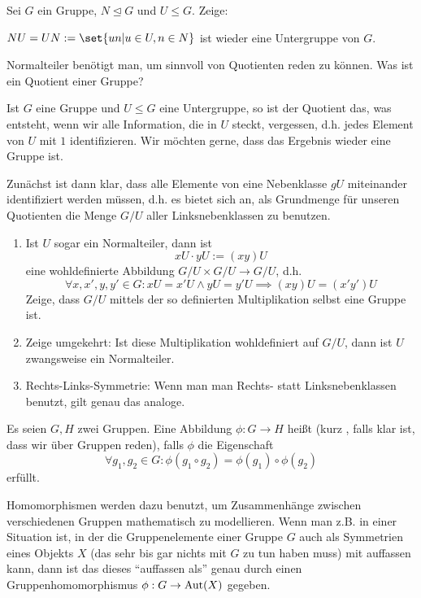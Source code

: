 \begin{sheet}
\begin{problem}[title={Normalteiler und Untergruppen},difficulty={leicht bis mittel}]
Sei $G$ ein Gruppe, $N\unlhd G$ und $U\leq G$. Zeige:

$NU = UN := \set{un | u\in U, n\in N}$ ist wieder eine Untergruppe von $G$.
\end{problem}

\begin{problem}[title={Quotientengruppen I: Konstruktion}, difficulty={fortgeschritten}]
Normalteiler benötigt man, um sinnvoll von Quotienten reden zu können. Was ist ein Quotient einer Gruppe?

Ist $G$ eine Gruppe und $U\leq G$ eine Untergruppe, so ist der Quotient das, was entsteht, wenn wir alle Information, die in $U$ steckt, vergessen, d.h. jedes Element von $U$ mit $1$ identifizieren. Wir möchten gerne, dass das Ergebnis wieder eine Gruppe ist.

Zunächst ist dann klar, dass alle Elemente von eine Nebenklasse $gU$ miteinander identifiziert werden müssen, d.h. es bietet sich an, als Grundmenge für unseren Quotienten die Menge $G/U$ aller Linksnebenklassen zu benutzen.
\begin{enumerate}
\item Ist $U$ sogar ein Normalteiler, dann ist
\[xU \cdot yU := (xy)U\]
eine wohldefinierte Abbildung $G/U \times G/U \to G/U$, d.h.
\[\forall x,x',y,y'\in G: xU=x'U \wedge yU=y'U \implies (xy)U = (x'y')U\]
Zeige, dass $G/U$ mittels der so definierten Multiplikation selbst eine Gruppe ist.
\item Zeige umgekehrt: Ist diese Multiplikation wohldefiniert auf $G/U$, dann ist $U$ zwangsweise ein Normalteiler.
\item Rechts-Links-Symmetrie: Wenn man man Rechts- statt Linksnebenklassen benutzt, gilt genau das analoge.
\end{enumerate}
\end{problem}



\begin{problem}[title={Gruppenhomomorphismen}]
Es seien $G,H$ zwei Gruppen. Eine Abbildung $\phi: G\to H$ heißt  (kurz , falls klar ist, dass wir über Gruppen reden), falls $\phi$ die Eigenschaft
\[\forall g_1,g_2\in G: \phi(g_1\circ g_2) = \phi(g_1)\circ \phi(g_2)\]
erfüllt.

Homomorphismen werden dazu benutzt, um Zusammenhänge zwischen verschiedenen Gruppen mathematisch zu modellieren. Wenn man z.B. in einer Situation ist, in der die Gruppenelemente einer Gruppe $G$ auch als Symmetrien eines Objekts $X$ (das sehr bis gar nichts mit $G$ zu tun haben muss) mit auffassen kann, dann ist das dieses \enquote{auffassen als} genau durch einen Gruppenhomomorphismus $\phi: G\to\operatorname{Aut}(X)$ gegeben.


\end{problem}
\end{sheet}

